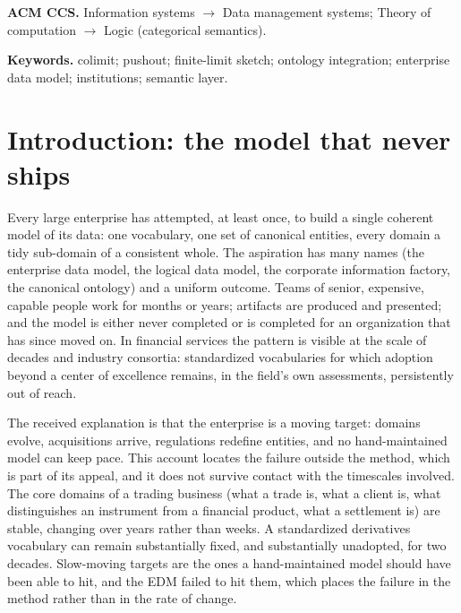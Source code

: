\documentclass[11pt]{article}
\theoremstyle{plain}
\theoremstyle{definition}
\begin{document}
\noindent\textbf{ACM CCS.} Information systems $\rightarrow$ Data management systems; Theory of computation $\rightarrow$ Logic (categorical semantics).

\noindent\textbf{Keywords.} colimit; pushout; finite-limit sketch; ontology integration; enterprise data model; institutions; semantic layer.

\section{Introduction: the model that never ships}

Every large enterprise has attempted, at least once, to build a single coherent model of its data: one vocabulary, one set of canonical entities, every domain a tidy sub-domain of a consistent whole. The aspiration has many names (the enterprise data model, the logical data model, the corporate information factory, the canonical ontology) and a uniform outcome. Teams of senior, expensive, capable people work for months or years; artifacts are produced and presented; and the model is either never completed or is completed for an organization that has since moved on. In financial services the pattern is visible at the scale of decades and industry consortia: standardized vocabularies for which adoption beyond a center of excellence remains, in the field's own assessments, persistently out of reach.

The received explanation is that the enterprise is a moving target: domains evolve, acquisitions arrive, regulations redefine entities, and no hand-maintained model can keep pace. This account locates the failure outside the method, which is part of its appeal, and it does not survive contact with the timescales involved. The core domains of a trading business (what a trade is, what a client is, what distinguishes an instrument from a financial product, what a settlement is) are stable, changing over years rather than weeks. A standardized derivatives vocabulary can remain substantially fixed, and substantially unadopted, for two decades. Slow-moving targets are the ones a hand-maintained model should have been able to hit, and the EDM failed to hit them, which places the failure in the method rather than in the rate of change.
\end{document}
